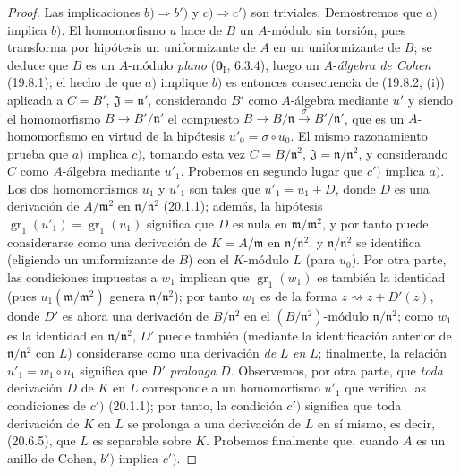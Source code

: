 \begin{proof}
Las implicaciones $b)\Rightarrow b')$ y $c)\Rightarrow c')$ son triviales.
Demostremos que $a)$ implica $b)$.
El homomorfismo $u$ hace de $B$ un $A$-módulo sin torsión, pues transforma por
hipótesis un uniformizante de $A$ en un uniformizante de $B$; se deduce que
$B$ es un $A$-módulo \emph{plano} ($\mathbf{0}_{\mathrm I}$, 6.3.4), luego un $A$-\emph{álgebra de
Cohen} (19.8.1); el hecho de que $a)$ implique $b)$ es entonces consecuencia de
(19.8.2, (i)) aplicada a $C=B'$, $\mathfrak J=\mathfrak n'$,
considerando $B'$ como $A$-álgebra mediante $u'$ y siendo el homomorfismo
$B\to B'/\mathfrak n'$ el compuesto
$B\to B/\mathfrak n\xrightarrow{\sigma}B'/\mathfrak n'$, que es un $A$-homomorfismo en
virtud de la hipótesis $u'_0=\sigma\circ u_0$. El mismo razonamiento prueba que
$a)$ implica $c)$, tomando esta vez $C=B/\mathfrak n^2$,
$\mathfrak J=\mathfrak n/\mathfrak n^2$, y considerando $C$ como
$A$-álgebra mediante $u'_1$.
Probemos en segundo lugar que $c')$ implica $a)$. Los dos homomorfismos
$u_1$ y $u'_1$ son tales que $u'_1=u_1+D$, donde $D$ es una derivación de
$A/\mathfrak m^2$ en $\mathfrak n/\mathfrak n^2$ (20.1.1); además,
la hipótesis $\operatorname{gr}_1(u'_1)=\operatorname{gr}_1(u_1)$ significa
que $D$ es nula en $\mathfrak m/\mathfrak m^2$, y por tanto puede
considerarse como una derivación de $K=A/\mathfrak m$ en
$\mathfrak n/\mathfrak n^2$, y $\mathfrak n/\mathfrak n^2$ se identifica
(eligiendo un uniformizante de $B$) con el $K$-módulo $L$ (para $u_0$).
Por otra parte, las condiciones impuestas a $w_1$ implican que
$\operatorname{gr}_1(w_1)$ es también la identidad (pues
$u_1(\mathfrak m/\mathfrak m^2)$ genera
$\mathfrak n/\mathfrak n^2$); por tanto $w_1$ es de la forma
$z\rightsquigarrow z+D'(z)$, donde $D'$ es ahora una derivación de
$B/\mathfrak n^2$ en el $(B/\mathfrak n^2)$-módulo
$\mathfrak n/\mathfrak n^2$; como $w_1$ es la identidad en
$\mathfrak n/\mathfrak n^2$, $D'$ puede también (mediante la identificación
anterior de $\mathfrak n/\mathfrak n^2$ con $L$) considerarse como una
derivación \emph{de} $L$ \emph{en} $L$; finalmente, la relación $u'_1=w_1\circ u_1$
significa que $D'$ \emph{prolonga} $D$. Observemos, por otra parte, que \emph{toda} derivación $D$
de $K$ en $L$ corresponde a un homomorfismo $u'_1$ que verifica las condiciones
de $c')$ (20.1.1); por tanto, la condición $c')$ significa que toda derivación de
$K$ en $L$ se prolonga a una derivación de $L$ en sí mismo, es decir,
(20.6.5), que $L$ es separable sobre $K$.
Probemos finalmente que, cuando $A$ es un anillo de Cohen, $b')$ implica $c')$.

\end{proof}
